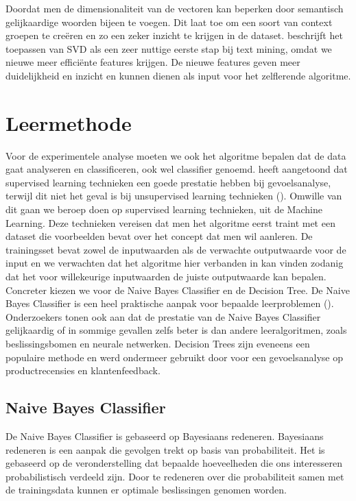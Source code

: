 Doordat men de dimensionaliteit van de vectoren kan beperken door semantisch gelijkaardige woorden bijeen te voegen. Dit laat toe om een soort van context groepen te cre\"eren en zo een zeker inzicht te krijgen in de dataset. \cite{maas2011learnin} beschrijft het toepassen van SVD als een zeer nuttige eerste stap bij text mining, omdat we nieuwe meer effici\"ente features krijgen. De nieuwe features geven meer duidelijkheid en inzicht en kunnen dienen als input voor het zelflerende algoritme.

\section{Leermethode}\label{Leermethode}

Voor de experimentele analyse moeten we ook het algoritme bepalen dat de data gaat analyseren en classificeren, ook wel classifier genoemd. \cite{ye2009sentiment} heeft aangetoond dat supervised learning technieken een goede prestatie hebben bij gevoelsanalyse, terwijl dit niet het geval is bij unsupervised learning technieken (\cite{rothfels2010unsupervised}).
Omwille van dit gaan we beroep doen op supervised learning technieken, uit de Machine Learning. Deze technieken vereisen dat men het algoritme eerst traint met een dataset die voorbeelden bevat over het concept dat men wil aanleren. De trainingsset bevat zowel de inputwaarden als de verwachte outputwaarde voor de input en we verwachten dat het algoritme hier verbanden in kan vinden zodanig dat het voor willekeurige inputwaarden de juiste outputwaarde kan bepalen.\\

Concreter kiezen we voor de Naive Bayes Classifier en de Decision Tree. De Naive Bayes Classifier is een heel praktische aanpak voor bepaalde leerproblemen (\cite{mitchell1997machine}). Onderzoekers \cite{Michie94machinelearning} tonen ook aan dat de prestatie van de Naive Bayes Classifier gelijkaardig of in sommige gevallen zelfs beter is dan andere leeralgoritmen, zoals beslissingsbomen en neurale netwerken. Decision Trees zijn eveneens een populaire methode en werd ondermeer gebruikt door \cite{zhang2008sentiment} voor een gevoelsanalyse op productrecensies en klantenfeedback.

\subsection{Naive Bayes Classifier}\label{Naive Bayes Classifier}

De Naive Bayes Classifier is gebaseerd op Bayesiaans redeneren. Bayesiaans redeneren is een aanpak die gevolgen trekt op basis van probabiliteit. Het is gebaseerd op de veronderstelling dat bepaalde hoeveelheden die ons interesseren probabilistisch verdeeld zijn. Door te redeneren over die probabiliteit samen met de trainingsdata kunnen er optimale beslissingen genomen worden.\\%

